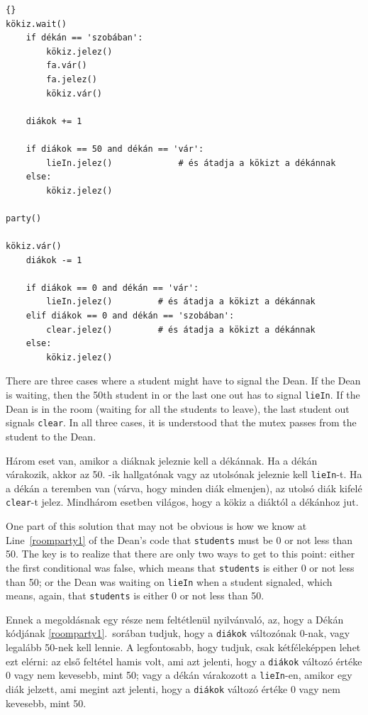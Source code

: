 \documentclass{book}
\begin{document}
\begin{lstlisting}[title={Szobabuli megoldás (diákok)}]{}
kökiz.wait()
    if dékán == 'szobában':
        kökiz.jelez()
        fa.vár()
        fa.jelez()
        kökiz.vár()

    diákok += 1

    if diákok == 50 and dékán == 'vár':
        lieIn.jelez()             # és átadja a kökizt a dékánnak
    else:
        kökiz.jelez()

party()

kökiz.vár()
    diákok -= 1

    if diákok == 0 and dékán == 'vár':
        lieIn.jelez()         # és átadja a kökizt a dékánnak
    elif diákok == 0 and dékán == 'szobában':
        clear.jelez()         # és átadja a kökizt a dékánnak
    else:
        kökiz.jelez()
\end{lstlisting}

There are three cases where a student might have to signal the Dean.
If the Dean is waiting, then the 50th student in or the last one out
has to signal {\tt lieIn}.  If the Dean is in the room (waiting for
all the students to leave), the last student out signals {\tt clear}.
In all three cases, it is understood that the mutex passes from the
student to the Dean.

Három eset van, amikor a diáknak jeleznie kell a dékánnak. Ha a dékán várakozik, akkor az
50. -ik hallgatónak vagy az utolsónak jeleznie kell {\tt lieIn}-t. Ha a dékán a teremben van
(várva, hogy minden diák elmenjen), az utolsó diák kifelé {\tt clear}-t jelez. Mindhárom
esetben világos, hogy a kökiz a diáktól a dékánhoz jut.

One part of this solution that may not be obvious is how we know at
Line~\ref{roomparty1} of the Dean's code that {\tt students} must be 0
or not less than 50.  The key is to realize that there are only two
ways to get to this point: either the first conditional was false,
which means that {\tt students} is either 0 or not less than 50; or
the Dean was waiting on {\tt lieIn} when a student signaled, which
means, again, that {\tt students} is either 0 or not less than 50.

Ennek a megoldásnak egy része nem feltétlenül nyilvánvaló, az, hogy a Dékán kódjának \ref{roomparty1}.~sorában
tudjuk, hogy a {\tt diákok} változónak 0-nak, vagy legalább 50-nek kell lennie. A
legfontosabb, hogy tudjuk, csak kétféleképpen lehet ezt elérni: az első feltétel hamis volt,
ami azt jelenti, hogy a {\tt diákok} változó értéke 0 vagy nem kevesebb, mint 50; vagy a dékán
várakozott a {\tt lieIn}-en, amikor egy diák jelzett, ami megint azt jelenti, hogy a {\tt diákok} változó
értéke 0 vagy nem kevesebb, mint 50.
\end{document}
